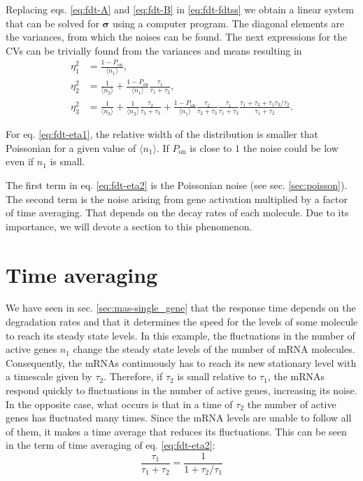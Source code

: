 Replacing eqs. \eqref{eq:fdt-A} and \eqref{eq:fdt-B} in \eqref{eq:fdt-fdtss} we obtain a linear system that can be solved for $\mathbf{\sigma}$ using a computer program. The diagonal elements are the variances, from which the noises can be found. The next expressions for the CVs can be trivially found from the variances and means resulting in
\begin{align}
  \eta_1^2 &= \frac{1-P_\text{on}}{\langle n_1\rangle}, \label{eq:fdt-eta1}\\
  \eta_2^2 &= \frac{1}{\langle n_2\rangle}+\frac{1-P_\text{on}}{\langle n_1\rangle}\frac{\tau_1}{\tau_1+\tau_2}, \label{eq:fdt-eta2}\\
  \eta_3^2 &= \frac{1}{\langle n_3\rangle} + \frac{1}{\langle n_2\rangle}\frac{\tau_2}{\tau_2+\tau_3}+\frac{1-P_\text{on}}{\langle n_1\rangle}\frac{\tau_2}{\tau_2+\tau_3}\frac{\tau_1}{\tau_1+\tau_3}\frac{\tau_1+\tau_3+\tau_1\tau_3/\tau_2}{\tau_1+\tau_2}. \label{eq:fdt-eta3}
\end{align}

For eq. \eqref{eq:fdt-eta1}, the relative width of the distribution is smaller that Poissonian for a given value of $\langle n_1\rangle$. If $P_\text{on}$ is close to $1$ the noise could be low even if $n_1$ is small.

The first term in eq. \eqref{eq:fdt-eta2} is the Poissonian noise (see sec. \ref{sec:poisson}). The second term is the noise arising from gene activation multiplied by a factor of time averaging. That depends on the decay rates of each molecule. Due to its importance, we will devote a section to this phenomenon.

\section{Time averaging}
\label{sec:fdt-time-ave}

We have seen in sec. \ref{sec:mas-single_gene} that the response time depends on the degradation rates and that it determines the speed for the levels of some molecule to reach its steady state levels. In this example, the fluctuations in the number of active genes $n_1$ change the steady state levels of the number of mRNA molecules. Consequently, the mRNAs continuously has to reach its new stationary level with a timescale given by $\tau_2$. Therefore, if $\tau_2$ is small relative to $\tau_1$, the mRNAs respond quickly to fluctuations in the number of active genes, increasing its noise. In the opposite case, what occurs is that in a time of $\tau_2$ the number of active genes has fluctuated many times. Since the mRNA levels are unable to follow all of them, it makes a time average that reduces its fluctuations. This can be seen in the term of time averaging of eq. \eqref{eq:fdt-eta2}:
\begin{equation*}
  \frac{\tau_1}{\tau_1+\tau_2} = \frac{1}{1+\tau_2/\tau_1}
\end{equation*}

